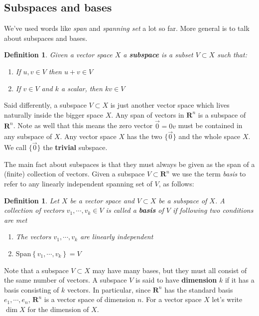 \documentclass[12pt]{article}
\numberwithin{equation}{subsection}
\numberwithin{figure}{subsection}
\newtheorem{defn}[subsection]{Definition}
\theoremstyle{note}
\newcommand\Span[1]{\mathrm{Span}\left\{#1\right\}}
\begin{document}
\subsection{Subspaces and bases}
We've used words like \textit{span} and \textit{spanning set} a lot so far. More general is to talk about subspaces and bases. 

\begin{defn} Given a vector space $X$ a \textbf{subspace} is a subset $V\subset X$ such that: 
\begin{enumerate}
	\item If $u,v\in V$ then $u+v\in V$
	\item If $v\in V$ and $k$ a scalar, then $kv\in V$
\end{enumerate}
\end{defn}

Said differently, a subspace $V\subset X$ is just another vector space which lives naturally inside the bigger space $X$. Any span of vectors in $\mathbf{R}^n$ is a subspace of $\mathbf{R}^n$. Note as well that this means the zero vector $\vec{0}=0v$ must be contained in any subspace of $X$. Any vector space $X$ has the two $\{\vec{0}\}$ and the whole space $X$. We call $\{\vec{0}\}$ the \textbf{trivial} subspace. 

The main fact about subspaces is that they must always be given as the span of a (finite) collection of vectors. Given a subspace $V\subset\mathbf{R}^n$ we use the term \textit{basis} to refer to any linearly independent spanning set of $V$, as follows:

\begin{defn}Let $X$ be a vector space and  $V\subset X$ be a subspace of $X$. A collection of vectors $v_1,\cdots,v_k\in V$ is called a \textbf{basis} of $V$ if following two conditions are met
\begin{enumerate}
	\item The vectors $v_1,\cdots,v_k$ are linearly independent
	\item $\Span{v_1,\cdots, v_k}=V$
\end{enumerate}
\end{defn}

Note that a subspace $V\subset X$ may have many bases, but they must all consist of the same number of vectors. A subspace $V$ is said to have \textbf{dimension} $k$ if it has a basis consisting of $k$ vectors. In particular, since $\mathbf{R}^n$ has the standard basis $e_1,\cdots,e_n$, $\mathbf{R}^n$ is a vector space of dimension $n$. For a vector space $X$ let's write $\dim X$ for the dimension of $X$. 
\end{document}
